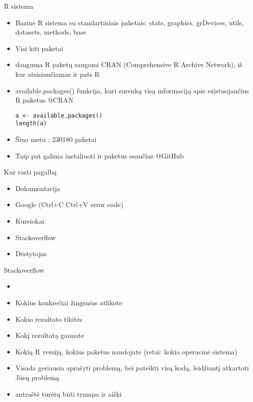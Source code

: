 \documentclass[11pt,xcolor=table]{beamer}
\begin{document}

\begin{frame}[fragile]{R sistema}
\begin{itemize}
\item Bazinė R sistema su standartiniais paketais: stats, graphics, grDevices, utils, datasets, methods, base 
\item Visi kiti paketai
\item dauguma R paketų saugomi CRAN (Comprehensive R Archive Network), iš kur atsisiunčiamas ir pats R
\item available.packages() funkcija, kuri surenką visą informaciją apie ezistuojančius R paketus @CRAN
\begin{lstlisting}
a <- available.packages()
length(a)
\end{lstlisting}
\item Šiuo metu : 230180 paketai
\item Taip pat galima instaliuoti ir paketus esančius @GitHub
\end{itemize}
\end{frame}


\begin{frame}{Kur rasti pagalbą}
\begin{itemize}
\item Dokumentacija
\item Google (Ctrl+C Ctrl+V error code)
\item Kursiokai
\item Stackoverflow
\item Dėstytojas
\end{itemize}
\end{frame}



\begin{frame}{Stackoverflow}
\begin{itemize}
\item \href{https://stackoverflow.com/}{\color{blue}{https://stackoverflow.com/}}
\item Kokius konkrečiai žingsnius atlikote
\item Kokio rezultato tikitės
\item Kokį rezultatą gaunate
\item Kokią R versiją, kokius paketus naudojate (retai: kokia operacinė sistema)
\item Visada geriausia aprašyti problemą, bei pateikti visą kodą, leidžiantį atkartoti Jūsų problemą
\item antraštė turėtų būti trumpa ir aiški
\end{itemize}
\end{frame}
\end{document}
